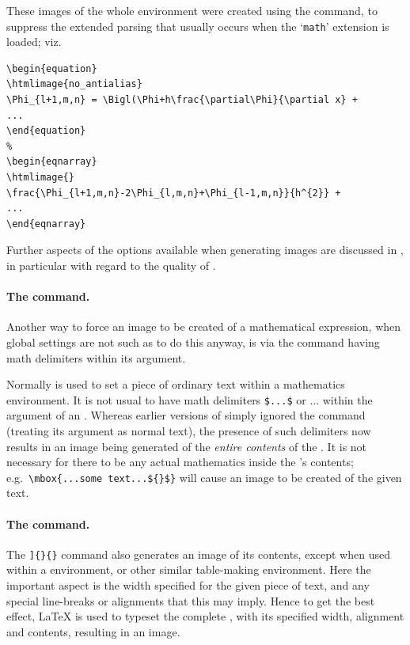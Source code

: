 \noindent
These images of the whole environment were created 
using the  command, to suppress the extended parsing 
that usually occurs when the `\texttt{math}' extension is loaded; viz.
%
\begin{small}
\begin{verbatim}
\begin{equation}
\htmlimage{no_antialias}
\Phi_{l+1,m,n} = \Bigl(\Phi+h\frac{\partial\Phi}{\partial x} +
...
\end{equation}
%
\begin{eqnarray}
\htmlimage{}
\frac{\Phi_{l+1,m,n}-2\Phi_{l,m,n}+\Phi_{l-1,m,n}}{h^{2}} +
...
\end{eqnarray}
\end{verbatim}
\end{small}
Further aspects of the options available when generating images 
are discussed in , in particular 
with regard to the quality of .



%
\paragraph*{The  command.}
Another way to force an image to be created of a mathematical expression,
when global settings are not such as to do this anyway, 
is via the  command having math delimiters within its argument.

Normally  is used to set a piece of ordinary text within a 
mathematics environment. It is not usual to have math delimiters 
\texttt{\$...\$} or \Lc{(}...\Lc{)} within the argument of an . 
Whereas earlier versions of \latextohtml{} simply ignored the  
command (treating its argument as normal text), 
the presence of such delimiters now results in an image being
generated of the \emph{entire contents} of the .
It is not necessary for there to be any actual mathematics inside
the 's contents;\html{\\}
e.g.\ \verb|\mbox{...some text...${}$}|
will cause an image to be created of the given text.


%
\paragraph*{The  command.}
The \Lc{parbox[}\verb|]{|\verb|}{|\verb|}| 
command also generates an image of its contents,
except when used within a  environment, or other
similar table-making environment.
Here the important aspect is the width specified for the given
piece of text, and any special line-breaks or alignments that
this may imply. Hence to get the best effect, \LaTeX{} is used
to typeset the complete , with its specified width,
alignment and contents, resulting in an image.


